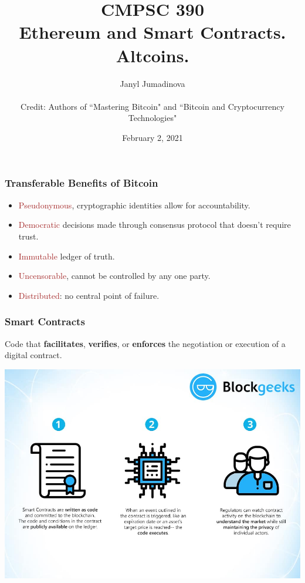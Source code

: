 \documentclass{beamer}
\title{CMPSC 390 \\ Ethereum and Smart Contracts. Altcoins.}
\author{Janyl Jumadinova \\ $ $ \\ Credit: Authors of ``Mastering Bitcoin" and ``Bitcoin and Cryptocurrency Technologies"}
\date{February 2, 2021}
\begin{document}
\begin{frame}
  \titlepage
\end{frame}

\begin{frame}
  \frametitle{Transferable Benefits of Bitcoin }
	\begin{itemize}
		\item \textcolor{brown}{Pseudonymous}, cryptographic identities allow  for accountability. \pause
		\item \textcolor{brown}{Democratic} decisions made through consensus  protocol that doesn't require trust. \pause
		\item \textcolor{brown}{Immutable} ledger of truth. \pause
		\item \textcolor{brown}{Uncensorable}, cannot be controlled by any one party. \pause
		\item \textcolor{brown}{Distributed}: no central point of failure.

	\end{itemize}
\end{frame}
\begin{frame}
  \frametitle{Smart Contracts}
  Code that \textbf{facilitates}, \textbf{verifies}, or \textbf{enforces} the negotiation or execution of a digital contract.

 	\centering
	\includegraphics[scale=0.28]{smart.jpg}
\end{frame}
\end{document}
